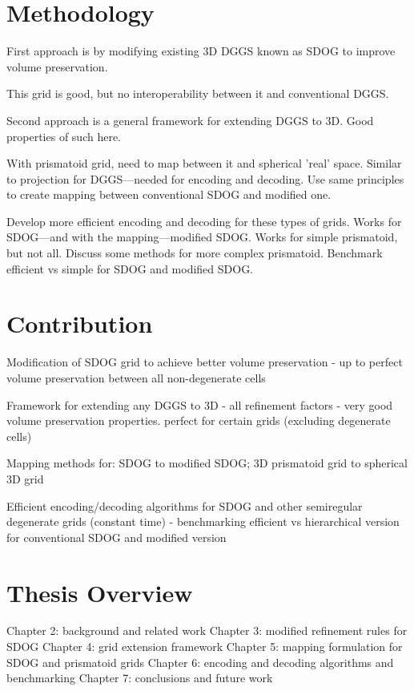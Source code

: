 \section{Methodology}

First approach is by modifying existing 3D DGGS known as SDOG to improve volume preservation.

This grid is good, but no interoperability between it and conventional DGGS.

Second approach is a general framework for extending DGGS to 3D. Good properties of such here.

With prismatoid grid, need to map between it and spherical 'real' space. Similar to projection for DGGS---needed for encoding and decoding. Use same principles to create mapping between conventional SDOG and modified one.

Develop more efficient encoding and decoding for these types of grids. Works for SDOG---and with the mapping---modified SDOG. Works for simple prismatoid, but not all. Discuss some methods for more complex prismatoid. Benchmark efficient vs simple for SDOG and modified SDOG.  

\section{Contribution}

Modification of SDOG grid to achieve better volume preservation
	- up to perfect volume preservation between all non-degenerate cells

Framework for extending any DGGS to 3D
	- all refinement factors
	- very good volume preservation properties. perfect for certain grids (excluding degenerate cells)

Mapping methods for: SDOG to modified SDOG; 3D prismatoid grid to spherical 3D grid

Efficient encoding/decoding algorithms for SDOG and other semiregular degenerate grids (constant time)
 	- benchmarking efficient vs hierarchical version for conventional SDOG and modified version

\section{Thesis Overview}

Chapter 2: background and related work
Chapter 3: modified refinement rules for SDOG
Chapter 4: grid extension framework
Chapter 5: mapping formulation for SDOG and prismatoid grids
Chapter 6: encoding and decoding algorithms and benchmarking
Chapter 7: conclusions and future work

